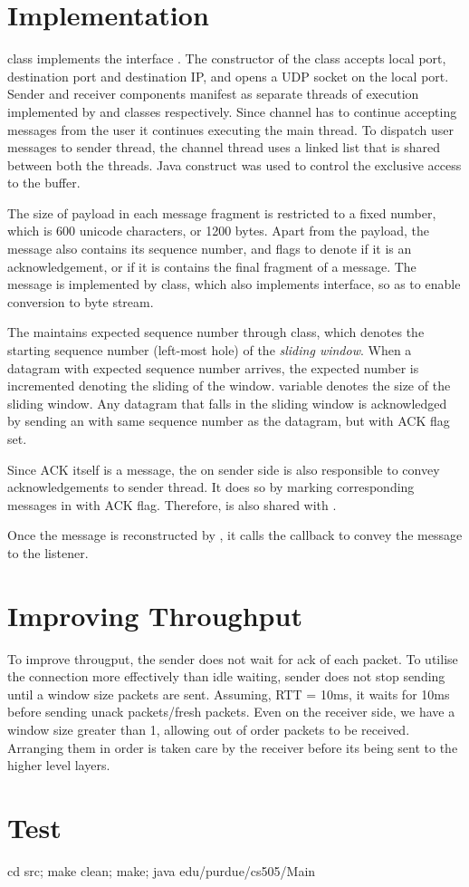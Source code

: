 \section{Implementation}
\label{sec:impl}

 class implements the interface .
The constructor of the class accepts local port, destination port and
destination IP, and opens a UDP socket on the local port. Sender and
receiver components manifest as separate threads of execution
implemented by  and  classes
respectively. Since channel has to continue accepting messages from
the user it continues executing the main thread. To dispatch
user messages to sender thread, the channel thread uses a
 linked list that is shared between both the threads.
Java construct  was used to control the exclusive
access to the buffer. 

The size of payload in each message fragment is restricted to a fixed
number, which is 600 unicode characters, or 1200 bytes. Apart from the
payload, the message also contains its sequence number, and flags to
denote if it is an acknowledgement, or if it is contains the final
fragment of a message. The message is implemented by 
class, which also implements  interface, so as to
enable conversion to byte stream. 

The  maintains expected sequence number through
 class, which denotes the starting sequence number
(left-most hole) of the \emph{sliding window}. When a datagram with
expected sequence number arrives, the expected number is incremented
denoting the sliding of the window. 
variable denotes the size of the sliding window. Any datagram that
falls in the sliding window is acknowledged by sending an
 with same sequence number as the datagram, but with
ACK flag set.

Since ACK itself is a message, the  on sender
side is also responsible to convey acknowledgements to sender thread.
It does so by marking corresponding messages in  with
ACK flag. Therefore,  is also shared with
.

Once the message is reconstructed by , it calls
the callback to convey the message to the listener.


\section{Improving Throughput}
\label{sec:efficiency}
To improve througput, the sender does not wait for ack of each packet. To utilise the connection more effectively than idle waiting, sender does not stop sending until a window size packets are sent. Assuming, RTT = 10ms, it waits for 10ms before sending unack packets/fresh packets.
Even on the receiver side, we have a window size greater than 1, allowing out of order packets to be received. Arranging them in order is taken care by the receiver before its being sent to the higher level layers.


\section{Test}
\label{sec:test}

cd src; make clean; make; java edu/purdue/cs505/Main
